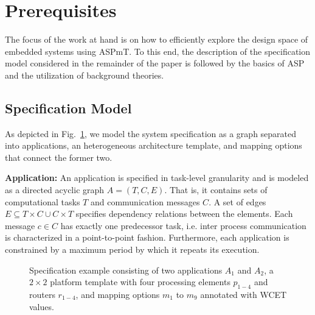 \section{Prerequisites}
\label{sec:model}
The focus of the work at hand is on how to efficiently explore the design space of embedded systems using \ac{ASPmT}. To this end, the description of the specification model considered in the remainder of the paper is followed by the basics of \acf{ASP} and the utilization of background theories. 
\subsection{Specification Model}
As depicted in Fig.~\ref{fig:specexample}, we model the system specification as a graph separated into applications, an heterogeneous architecture template, and mapping options that connect the former two.\par
\textbf{Application: }
An application is specified in task-level granularity and is modeled as a directed acyclic graph $A=(T,C,E)$. That is, it contains sets of computational tasks $T$ and communication messages $C$. A set of edges $E\subseteq T\times C \cup C\times T$ specifies dependency relations between the elements. Each message $c\in C$ has exactly one predecessor task, i.e. inter process communication is characterized in a point-to-point fashion. Furthermore, each application is constrained by a maximum period by which it repeats its execution.
\begin{figure}
	\centering
	
	\vspace*{-0.1cm}
	\caption{Specification example consisting of two applications $A_1$ and $A_2$, a $2\times 2$ platform template with four processing elements $p_{1-4}$ and routers $r_{1-4}$, and mapping options $m_1$ to $m_9$ annotated with WCET values. }
	\label{fig:specexample}
\end{figure}

